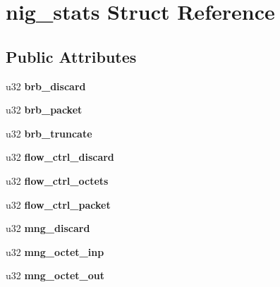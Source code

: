 \hypertarget{structnig__stats}{
\section{nig\_\-stats Struct Reference}
\label{structnig__stats}
}
\subsection*{Public Attributes}
\begin{DoxyCompactItemize}
\item 
\hypertarget{structnig__stats_aef13a0d306db7f9876233e27b9a842ca}{
u32 {\bfseries brb\_\-discard}}
\label{structnig__stats_aef13a0d306db7f9876233e27b9a842ca}

\item 
\hypertarget{structnig__stats_a847ed08cc35088c375da031a140a7e62}{
u32 {\bfseries brb\_\-packet}}
\label{structnig__stats_a847ed08cc35088c375da031a140a7e62}

\item 
\hypertarget{structnig__stats_ae585cdaa23805fb59ee8bede8905a299}{
u32 {\bfseries brb\_\-truncate}}
\label{structnig__stats_ae585cdaa23805fb59ee8bede8905a299}

\item 
\hypertarget{structnig__stats_a4b0f55474d3e3558208ae146f6dbe545}{
u32 {\bfseries flow\_\-ctrl\_\-discard}}
\label{structnig__stats_a4b0f55474d3e3558208ae146f6dbe545}

\item 
\hypertarget{structnig__stats_a47fbef360627077e3254a2392106c29b}{
u32 {\bfseries flow\_\-ctrl\_\-octets}}
\label{structnig__stats_a47fbef360627077e3254a2392106c29b}

\item 
\hypertarget{structnig__stats_a495c794463cbdb25f58260be2505fec4}{
u32 {\bfseries flow\_\-ctrl\_\-packet}}
\label{structnig__stats_a495c794463cbdb25f58260be2505fec4}

\item 
\hypertarget{structnig__stats_afeb63155077bc4f10285edf36cd7a856}{
u32 {\bfseries mng\_\-discard}}
\label{structnig__stats_afeb63155077bc4f10285edf36cd7a856}

\item 
\hypertarget{structnig__stats_adbfdc6f9fe43076887fcb1778138c84c}{
u32 {\bfseries mng\_\-octet\_\-inp}}
\label{structnig__stats_adbfdc6f9fe43076887fcb1778138c84c}

\item 
\hypertarget{structnig__stats_a17ab16f339b564c7c5adbc38e6ca78be}{
u32 {\bfseries mng\_\-octet\_\-out}}
\label{structnig__stats_a17ab16f339b564c7c5adbc38e6ca78be}


\end{DoxyCompactItemize}
